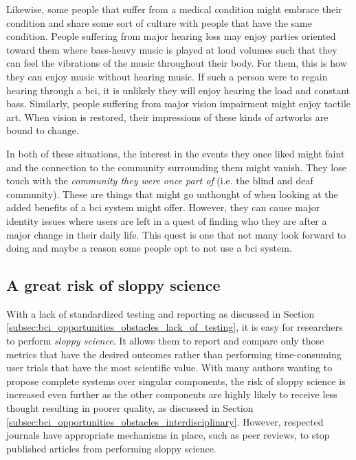 Likewise, some people that suffer from a medical condition might embrace their condition and share some sort of culture with people that have the same condition.
People suffering from major hearing loss may enjoy parties oriented toward them where bass-heavy music is played at loud volumes such that they can feel the vibrations of the music throughout their body.
For them, this is how they can enjoy music without hearing music.
If such a person were to regain hearing through a \gls{bci}, it is unlikely they will enjoy hearing the load and constant bass.
Similarly, people suffering from major vision impairment might enjoy tactile art.
When vision is restored, their impressions of these kinds of artworks are bound to change.

In both of these situations, the interest in the events they once liked might faint and the connection to the community surrounding them might vanish.
They lose touch with the \textit{community they were once part of} (i.e. the blind and deaf community).
These are things that might go unthought of when looking at the added benefits of a \gls{bci} system might offer.
However, they can cause major identity issues where users are left in a quest of finding who they are after a major change in their daily life.
This quest is one that not many look forward to doing and maybe a reason some people opt to not use a \gls{bci} system.



\subsection{A great risk of sloppy science}
\label{subsec:bci_ethical_sloppy_science}

With a lack of standardized testing and reporting as discussed in Section \ref{subsec:bci_opportunities_obstacles_lack_of_testing}, it is easy for researchers to perform \textit{sloppy science}.
It allows them to report and compare only those metrics that have the desired outcomes rather than performing time-consuming user trials that have the most scientific value.
With many authors wanting to propose complete systems over singular components, the risk of sloppy science is increased even further as the other components are highly likely to receive less thought resulting in poorer quality, as discussed in Section \ref{subsec:bci_opportunities_obstacles_interdisciplinary}.
However, respected journals have appropriate mechanisms in place, such as peer reviews, to stop published articles from performing sloppy science.

